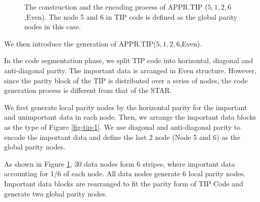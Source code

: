 \documentclass[sigconf]{acmart}
\begin{document}
\begin{figure}[ht]
\caption{The construction and the encoding process of APPR.TIP ($5,1,2,6$,Even). The node 5 and 6 in TIP code is defined as the global parity nodes in this case.}
\label{fig-ap-TIP}
\end{figure}

We then introduce the generation of APPR.TIP($5,1,2,6$,Even).

In the code segmentation phase, we split TIP code into horizontal, diagonal and anti-diagonal parity. The important data is arranged in Even structure. However, since the parity block of the TIP is distributed over a series of nodes, the code generation process is different from that of the STAR.

We first generate local parity nodes by the horizontal parity for the important and unimportant data in each node. Then, we arrange the important data blocks as the type of Figure \ref{fig-tip-1}.
We use diagonal and anti-diagonal parity to encode the important data and define the last 2 node (Node 5 and 6) as the global parity nodes.

As shown in Figure \ref{fig-ap-TIP}, 30 data nodes form 6 stripes, where important data accounting for 1/6 of each node.
All data nodes generate 6 local parity nodes.
Important data blocks are rearranged to fit the parity form of TIP Code and generate two global parity nodes.
\end{document}
